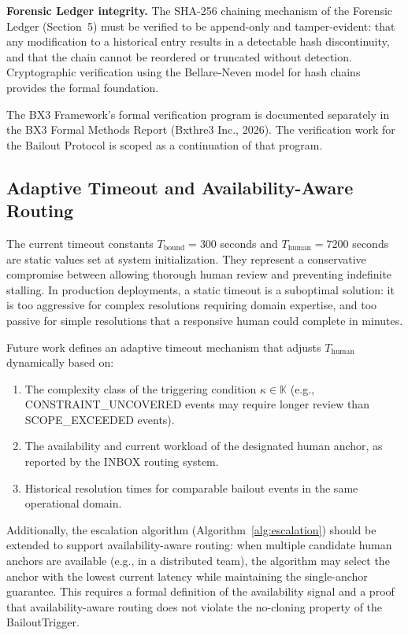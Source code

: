 \bigskip

\noindent\textbf{Forensic Ledger integrity.} The SHA-256 chaining mechanism of the Forensic Ledger (Section~5) must be verified to be append-only and tamper-evident: that any modification to a historical entry results in a detectable hash discontinuity, and that the chain cannot be reordered or truncated without detection. Cryptographic verification using the Bellare-Neven model for hash chains provides the formal foundation.

\bigskip

The BX3 Framework's formal verification program is documented separately in the BX3 Formal Methods Report (Bxthre3 Inc., 2026). The verification work for the Bailout Protocol is scoped as a continuation of that program.

\subsection{Adaptive Timeout and Availability-Aware Routing}
\label{sec:adaptive-timeout}

The current timeout constants $T_{\text{bound}} = 300$ seconds and $T_{\text{human}} = 7200$ seconds are static values set at system initialization. They represent a conservative compromise between allowing thorough human review and preventing indefinite stalling. In production deployments, a static timeout is a suboptimal solution: it is too aggressive for complex resolutions requiring domain expertise, and too passive for simple resolutions that a responsive human could complete in minutes.

Future work defines an adaptive timeout mechanism that adjusts $T_{\text{human}}$ dynamically based on:

\begin{enumerate}\setlength\itemsep{0.25em}
\item The complexity class of the triggering condition $\kappa \in \mathbb{K}$ (e.g., CONSTRAINT\_UNCOVERED events may require longer review than SCOPE\_EXCEEDED events).
\item The availability and current workload of the designated human anchor, as reported by the INBOX routing system.
\item Historical resolution times for comparable bailout events in the same operational domain.
\end{enumerate}

Additionally, the escalation algorithm (Algorithm~\ref{alg:escalation}) should be extended to support availability-aware routing: when multiple candidate human anchors are available (e.g., in a distributed team), the algorithm may select the anchor with the lowest current latency while maintaining the single-anchor guarantee. This requires a formal definition of the availability signal and a proof that availability-aware routing does not violate the no-cloning property of the BailoutTrigger.

